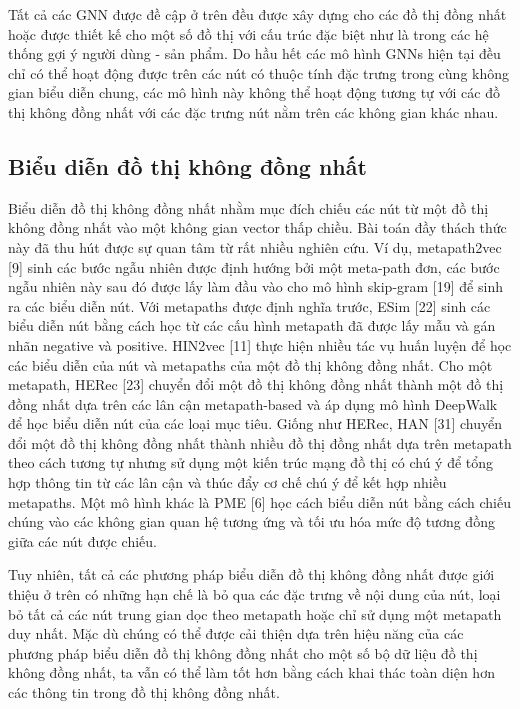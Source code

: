 Tất cả các GNN được đề cập ở trên đều được xây dựng cho các đồ thị đồng nhất hoặc được thiết kế cho một số đồ thị với cấu trúc đặc biệt như là trong các hệ thống gợi ý người dùng - sản phẩm. Do hầu hết các mô hình GNNs hiện tại đều chỉ có thể hoạt động được trên các nút có thuộc tính đặc trưng trong cùng không gian biểu diễn chung, các mô hình này không thể hoạt động tương tự với các đồ thị không đồng nhất với các đặc trưng nút nằm trên các không gian khác nhau.

\subsection[short]{Biểu diễn đồ thị không đồng nhất}
Biểu diễn đồ thị không đồng nhất nhằm mục đích chiếu các nút từ một đồ thị không đồng nhất vào một không gian vector thấp chiều. Bài toán đầy thách thức này đã thu hút được sự quan tâm từ rất nhiều nghiên cứu. Ví dụ, metapath2vec [9] sinh các bước ngẫu nhiên được định hướng bởi một meta-path đơn, các bước ngẫu nhiên này sau đó được lấy làm đầu vào cho mô hình skip-gram [19] để sinh ra các biểu diễn nút. Với metapaths được định nghĩa trước, ESim [22] sinh các biểu diễn nút bằng cách học từ các cấu hình metapath đã được lấy mẫu và gán nhãn negative và positive. HIN2vec [11] thực hiện nhiều tác vụ huấn luyện để học các biểu diễn của nút và metapaths của một đồ thị không đồng nhất. Cho một metapath, HERec [23] chuyển đổi một đồ thị không đồng nhất thành một đồ thị đồng nhất dựa trên các lân cận metapath-based và áp dụng mô hình DeepWalk để học biểu diễn nút của các loại mục tiêu. Giống như HERec, HAN [31] chuyển đổi một đồ thị không đồng nhất thành nhiều đồ thị đồng nhất dựa trên metapath theo cách tương tự nhưng sử dụng một kiến trúc mạng đồ thị có chú ý để tổng hợp thông tin từ các lân cận và thúc đẩy cơ chế chú ý để kết hợp nhiều metapaths. Một mô hình khác là PME [6] học cách biểu diễn nút bằng cách chiếu chúng vào các không gian quan hệ tương ứng và tối ưu hóa mức độ tương đồng giữa các nút được chiếu.

Tuy nhiên, tất cả các phương pháp biểu diễn đồ thị không đồng nhất được giới thiệu ở trên có những hạn chế là bỏ qua các đặc trưng về nội dung của nút, loại bỏ tất cả các nút trung gian dọc theo metapath hoặc chỉ sử dụng một metapath duy nhất. Mặc dù chúng có thể được cải thiện dựa trên hiệu năng của các phương pháp biểu diễn đồ thị không đồng nhất cho một số bộ dữ liệu đồ thị không đồng nhất, ta vẫn có thể làm tốt hơn bằng cách khai thác toàn diện hơn các thông tin trong đồ thị không đồng nhất. 
